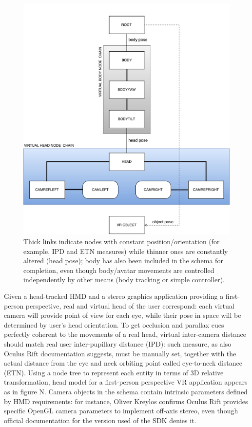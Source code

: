 \begin{figure}
\centering
\includegraphics[width=\linewidth]{schemas/classic-head-model_nodetree}
\caption{Thick links indicate nodes with constant position/orientation (for example, IPD and ETN measures) while thinner ones are constantly altered (head pose); body has also been included in the schema for completion, even though body/avatar movements are controlled independently by other means (body tracking or simple controller).}
\label{fig:classic_head_model}
\end{figure}

Given a head-tracked HMD and a stereo graphics application providing a first-person perspective, real and virtual head of the user correspond: each virtual camera will provide point of view for each eye, while their pose in space will be determined by user's head orientation. To get occlusion and parallax cues perfectly coherent to the movements of a real head, virtual inter-camera distance should match real user inter-pupillary distance (IPD): such measure, as also Oculus Rift documentation suggests, must be manually set, together with the actual distance from the eye and neck orbiting point called eye-to-neck distance (ETN). Using a node tree to represent each entity in terms of 3D relative transformation, head model for a first-person perspective VR application appears as in figure N. Camera objects in the schema contain intrinsic parameters defined by HMD requirements: for instance, Oliver Kreylos \cite{link_oculus_limits} confirms Oculus Rift provides specific OpenGL camera parameters to implement off-axis stereo, even though official documentation for the version used of the SDK denies it.

